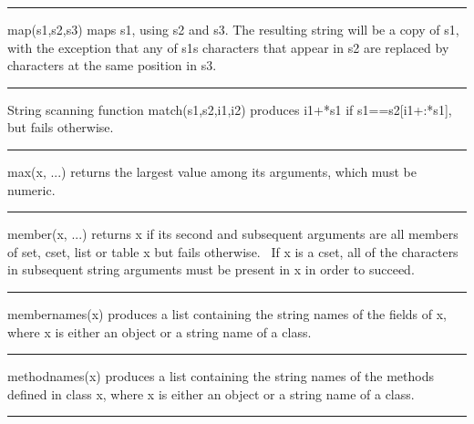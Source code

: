 \bigskip\hrule\vspace{0.1cm}

\noindent
{}\textsf{map(s1,s2,s3)} maps \textsf{s1}, using
\textsf{s2} and \textsf{s3}. The resulting string will be a copy of
\textsf{s1}, with the exception that any of
\textsf{s1}{\textquotesingle}s characters that appear in \textsf{s2}
are replaced by characters at the same position in \textsf{s3}.

\bigskip\hrule\vspace{0.1cm}

\noindent
{}String scanning function \textsf{match(s1,s2,i1,i2)}
produces \textsf{i1+*s1} if \textsf{s1==s2[i1+:*s1]}, but fails
otherwise.

\bigskip\hrule\vspace{0.1cm}

\noindent
{}\textsf{max(x, ...)} returns the largest value among its
arguments, which must be numeric.

\bigskip\hrule\vspace{0.1cm}

\noindent
{}\textsf{member(x, ...)} returns \textsf{x} if its second
and subsequent arguments are all members of set, cset, list or table
\textsf{x} but fails otherwise. \ If \textsf{x} is a cset, all of the
characters in subsequent string arguments must be present in \textsf{x}
in order to succeed.

\bigskip\hrule\vspace{0.1cm}

\noindent
\textsf{membernames(x)} produces a list containing the string names of
the fields of x, where x is either an object or a string name of a
class.

\bigskip\hrule\vspace{0.1cm}

\noindent
\textsf{methodnames(x)} produces a list containing the string names of
the methods defined in class \textsf{x}, where \textsf{x} is either an
object or a string name of a class.

\bigskip\hrule\vspace{0.1cm}

